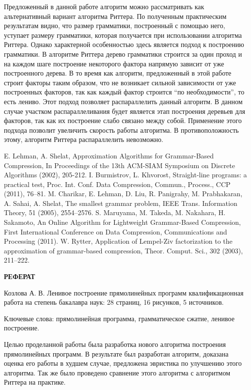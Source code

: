 \documentclass[12pt,a4paper]{extarticle}
\theoremstyle{break}
\begin{document}
Предложенный в данной работе алгоритм можно рассматривать как альтернативный
вариант алгоритма Риттера. По полученным практическим результатам видно, что
размер грамматики, построенный с помощью него, уступает размеру грамматики,
которая получается при использовании алгоритма Риттера. Однако характерной
особенностью здесь является подход к построению грамматики. В алгоритме Риттера
дерево грамматики строится за один проход и на каждом шаге построение некоторого
фактора напрямую зависит от уже построенного дерева. В то время как алгоритм,
предложенный в этой работе строит факторы таким образом, что не возникает
сильной зависимости от уже построенных факторов, так как каждый фактор строится
``по необходимости'', то есть лениво. Этот подход позволяет распараллелить
данный алгоритм. В данном случае участком распараллеливания будет является этап
построения деревьев для факторов, так как их построение слабо связано между
собой. Применение этого подхода позволит увеличить скорость работы алгоритма. В
противоположность этому, алгоритм Риттера распараллелить невозможно.



\newpage 

\begin{thebibliography}{5}

 E. Lehman, A. Shelat, Approximation Algorithms for
Grammar-Based Compression, In Proceedings of the 13th ACM-SIAM Symposium on
Discrete Algorithms (2002), 205-212.
 I. Burmistrov, L. Khvorost, Straight-line programs: a practical
test, Proc. Int. Conf. Data Compression, Commun., Process., CCP (2011), 76–81.
 M. Charikar, E. Lehman, D. Liu, R. Panigrahy, M. Prabhakaran, A.
Sahai, A. Shelat, The smallest grammar problem, IEEE Trans. Information Theory, 51 (2005), 2554–2576.
 S. Maruyama, M. Takeda, M. Nakahara, H. Sakamoto, An
Online Algorithm for Lightweight Grammar-Based Compression, First
International Conference on Data Compression, Communications and Processing
(2011).
 W. Rytter, Application of Lempel-Ziv factorization to the
approximation of grammar-based compression, Theor. Comput. Sci., 302 (2003), 211–222.

\end{thebibliography}

\newpage
\thispagestyle{empty}
\begin{center}
	\textbf{РЕФЕРАТ}
\end{center}

Козлова А. В. Ленивое построение прямолинейных программ квалификационная работа
на степень бакалавра наук: 28 страниц, 16 рисунков, 5 источников.

Ключевые слова: прямолинейная программа, грамматическое сжатие, ленивое
построение.

Целью проделанной работы была разработка нового алгоритма построения
прямолинейных программ. В результате был разработан алгоритм, доказана оценка
его работы в худшем случае, предложена эвристика по улучшению этого алгоритма.
Так же было проведено сравнение этого алгоритма с алгоритмом Риттера на
практике.
\end{document}
